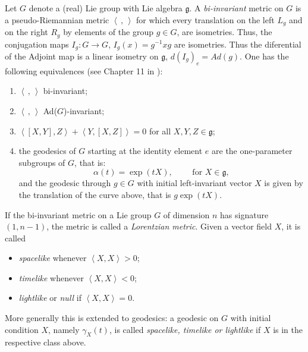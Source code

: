 \documentclass[11pt]{amsart}
\newcommand{\lela}{\left \langle}
\newcommand{\rira}{\right \rangle}
\newcommand{\bil}{\lela\,,\,\rira}
\newcommand{\mgg}{\mathfrak g }
\theoremstyle{plain}
\theoremstyle{definition}
\theoremstyle{remark}
\begin{document}
	Let $G$ denote a (real) Lie group with Lie algebra $\mgg$. 
	A \textit{bi-invariant} metric on  $G$ is a pseudo-Riemannian metric $\bil$ for which every translation on the left $L_g$ and on the right $R_g$ by elements of the group $g\in G$, are isometries. Thus, the conjugation maps $I_g: G \to G$, $I_g(x)=g^{-1}xg$ are isometries. Thus the diferential of the Adjoint map is a linear isometry on $\mgg$, $d(I_g)_e= Ad(g)$. One has the following equivalences (see Chapter 11 in \cite{ON}):
	\begin{enumerate}\label{[(i)]}
		\item $\bil$ bi-invariant;
		\item $\bil$ Ad($G$)-invariant;
		\item $\lela [X, Y], Z\rira + \lela Y, [X, Z]\rira= 0$ for all $X, Y, Z \in\mgg$;
		\item the geodesics of $G$ starting at the identity element $e$ are the one-parameter subgroups of $G$, that is:
		\begin{equation}\label{onepara}
			\alpha(t)=\exp(tX), \qquad \mbox{ for }X  \in \mgg, 
		\end{equation}
		and the geodesic through $g\in G$ with initial left-invariant vector $X$ is given by the translation of the curve above, that is $g\exp(tX)$. 
	\end{enumerate}
	If the bi-invariant metric on a Lie group $G$ of dimension $n$ has signature $(1,n-1)$, the metric is called a {\em Lorentzian metric}. Given a vector field  $X$,  it  is called 
	\begin{itemize}
		\item {\em spacelike} whenever $\lela X,X \rira >0$;
		\item {\em timelike} whenever $\lela X,X \rira < 0$;
		\item {\em lightlike} or {\em null}  if  $\lela X,X \rira = 0$.
	\end{itemize}
More generally this is extended to geodesics: 	a geodesic on $G$ with  initial condition $X$, namely $\gamma_X(t)$, is called {\em spacelike, timelike or lightlike} if $X$ is in the respective class above. 
\end{document}
